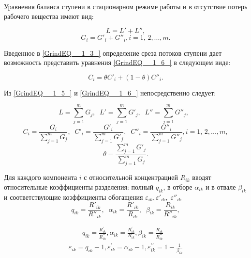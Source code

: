 Уравнения баланса ступени в стационарном режиме работы и в отсутствие потерь рабочего вещества имеют вид:

\begin{equation} \label{GrindEQ__1_5_} 
  L=L'+L'', 
  \end{equation} 
  \begin{equation} \label{GrindEQ__1_6_} 
  G_{i} =G'_{i} +G''_{i} , i=1,\, 2,...,m.             
\end{equation} 
  

Введенное в \ref{GrindEQ__1_3_} определение среза потоков ступени дает возможность представить уравнения \ref{GrindEQ__1_6_} в следующем виде:

\begin{equation} \label{GrindEQ__1_7_} 
  C_{i} =\theta C'_{i} +(1-\theta )C''_{i} . 
\end{equation} 

Из \ref{GrindEQ__1_5_} и \ref{GrindEQ__1_6_} непосредственно следует:

\begin{equation} \label{GrindEQ__1_8_} 
  L=\sum _{j=1}^{m}G_{j}  ,\; \; L'=\sum _{j=1}^{m}G'_{j} ,\; \;  L''=\sum _{j=1}^{m}G''_{j} ,\; \;   
  \end{equation} 
  \begin{equation} \label{GrindEQ__1_9_} 
  C_{i} =\frac{G_{i} }{\sum _{j=1}^{m}G_{j}  } ,\; \; C'_{i} =\frac{G'_{i} }{\sum _{j=1}^{m}G'_{j}  } ,\; \; C''_{i} =\frac{G''_{i} }{\sum _{j=1}^{m}G''_{j}  } , i=1,\, 2,...,m,             
  \end{equation} 
  \begin{equation} \label{GrindEQ__1_10_} 
  \theta =\frac{\sum _{j=1}^{m}G'_{j}  }{\sum _{j=1}^{m}G_{j}  } .            
\end{equation} 

Для каждого компонента $i$ с относительной концентрацией $R_{ik}$ вводят относительные коэффициенты разделения: полный $q_{ik}$, в отборе $\alpha _{ik} $ и в отвале $\beta _{ik} $ и соответствующие коэффициенты обогащения $\varepsilon _{ik} ,\varepsilon '_{ik} ,\; \varepsilon ''_{ik} \; $
\[q_{ik} =\frac{R'_{ik} }{R''_{ik} } ,\; \; \alpha _{ik} =\frac{R'_{ik} }{R_{ik} } ,\; \; \beta _{ik} =\frac{R_{ik} }{R''_{ik} } ,\] 

\begin{equation} \label{GrindEQ__1_11_} 
  \begin{array}{l}
    \qquad q_{i k}=\frac{R_{i k}^{\prime}}{R_{i k}^{\prime \prime}}, \alpha_{i k}=\frac{R_{i k}^{\prime}}{R_{i k}}, \beta_{i k}=\frac{R_{i k}}{R_{i k}^{\prime \prime}} \\
    \varepsilon_{i k}=q_{i k}-1, \varepsilon_{i k}^{\prime}=\alpha_{i k}-1, \varepsilon_{i k}^{\prime \prime}=1-\frac{1}{\beta_{i k}}
    \end{array}
\end{equation} 

